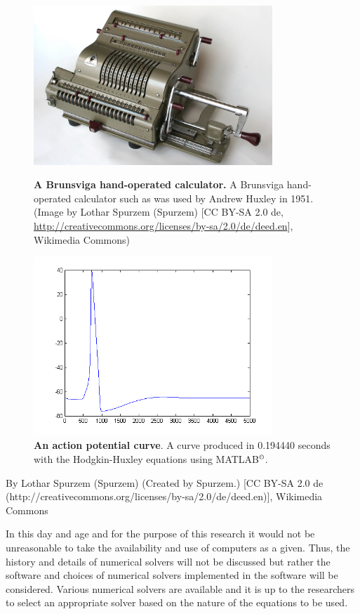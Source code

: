 \begin{figure}[H]
	\centering
		\includegraphics[width=9cm]{graphics/Brunsviga.jpg}
		\caption[A Brunsviga hand-operated calculator]{\textbf{A Brunsviga hand-operated calculator.} A Brunsviga hand-operated calculator such as was used by Andrew Huxley in 1951. (Image by Lothar Spurzem (Spurzem) [CC BY-SA 2.0 de, \url{http://creativecommons.org/licenses/by-sa/2.0/de/deed.en}], Wikimedia Commons)} 
		\label{fig:brunsviga}

		\includegraphics[width=9cm]{graphics/HH_curve.png}
		\caption[An action potential curve]{\textbf{An action potential curve}. A curve produced in 0.194440 seconds with the Hodgkin-Huxley equations using MATLAB$^{\copyright}$.} 
		\label{fig:hh_curve}
\end{figure}

By Lothar Spurzem (Spurzem) (Created by Spurzem.) [CC BY-SA 2.0 de (http://creativecommons.org/licenses/by-sa/2.0/de/deed.en)], Wikimedia Commons

In this day and age and for the purpose of this research it would not be unreasonable to take the availability and use of computers as a given. Thus, the history and details of numerical solvers will not be discussed but rather the software and choices of numerical solvers implemented in the software will be considered. Various numerical solvers are available and it is up to the researchers to select an appropriate solver based on the nature of the equations to be used.

